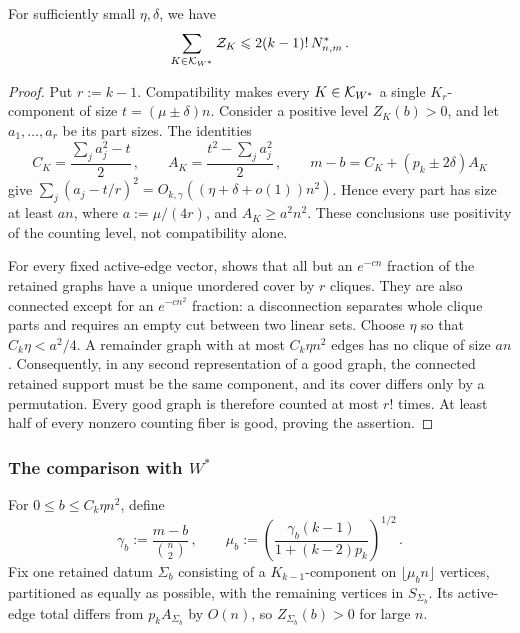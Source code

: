 \begin{lemma}\label{lemma:canonical-clean-lower-K1k}
For sufficiently small $\eta,\delta$, we have
$$\sum_{K\in{\mathcal K}_{W^\ast}}{\mathcal Z}_K\leqslant2(k-1)!\,N^\ast_{n,m}\,.$$
\end{lemma}
\begin{proof}
Put $r:=k-1$. Compatibility makes every $K\in{\mathcal K}_{W^\ast}$ a single $K_r$-component of size $t=(\mu\pm\delta)n$. Consider a positive level $Z_K(b)>0$, and let $a_1,\dots,a_r$ be its part sizes. The identities
$$C_K=\frac{\sum_j a_j^2-t}{2}\,,\qquad A_K=\frac{t^2-\sum_j a_j^2}{2}\,,\qquad m-b=C_K+(p_k\pm2\delta)A_K$$
give $\sum_j(a_j-t/r)^2=O_{k,\gamma}((\eta+\delta+o(1))n^2)$. Hence every part has size at least $a n$, where $a:=\mu/(4r)$, and $A_K\geq a^2n^2$. These conclusions use positivity of the counting level, not compatibility alone.

For every fixed active-edge vector,  shows that all but an $e^{-cn}$ fraction of the retained graphs have a unique unordered cover by $r$ cliques. They are also connected except for an $e^{-cn^2}$ fraction: a disconnection separates whole clique parts and requires an empty cut between two linear sets. Choose $\eta$ so that $C_k\eta<a^2/4$. A remainder graph with at most $C_k\eta n^2$ edges has no clique of size $a n$. Consequently, in any second representation of a good graph, the connected retained support must be the same component, and its cover differs only by a permutation. Every good graph is therefore counted at most $r!$ times. At least half of every nonzero counting fiber is good, proving the assertion.
\end{proof}

\subsubsection{The comparison with $W^\ast$}\label{subsec:subcritical-comparison-K1k}
For $0\leq b\leq C_k\eta n^2$, define
\begin{equation}\label{eqn:sub-gamma-b-K1k}
\gamma_b:=\frac{m-b}{\binom n2}\,,\qquad \mu_b:=\left(\frac{\gamma_b(k-1)}{1+(k-2)p_k}\right)^{1/2}\,.
\end{equation}
Fix one retained datum $\Sigma_b$ consisting of a $K_{k-1}$-component on $\lfloor\mu_bn\rfloor$ vertices, partitioned as equally as possible, with the remaining vertices in $S_{\Sigma_b}$. Its active-edge total differs from $p_kA_{\Sigma_b}$ by $O(n)$, so $Z_{\Sigma_b}(b)>0$ for large $n$.

